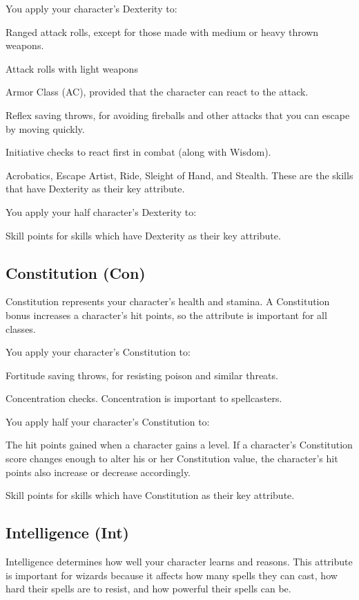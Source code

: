 You apply your character's Dexterity to:
\begin{itemize*}
\item Ranged attack rolls, except for those made with medium or heavy thrown weapons.
\item Attack rolls with light weapons
\item Armor Class (AC), provided that the character can react to the attack.
\item Reflex saving throws, for avoiding fireballs and other attacks that you can escape by moving quickly.
\item Initiative checks to react first in combat (along with Wisdom).
\item Acrobatics, Escape Artist, Ride, Sleight of Hand, and Stealth.  These are the skills that have Dexterity as their key attribute.
\end{itemize*}
You apply your half character's Dexterity to:
\begin{itemize*}
\item Skill points for skills which have Dexterity as their key attribute.
\end{itemize*}

\subsection{Constitution (Con)}
Constitution represents your character's health and stamina. A Constitution bonus increases a character's hit points, so the attribute is important for all classes.

You apply your character's Constitution to:
\begin{itemize*}
\item Fortitude saving throws, for resisting poison and similar threats.
\item Concentration checks. Concentration is important to spellcasters.
\end{itemize*}
You apply half your character's Constitution to:
\begin{itemize*}
\item The hit points gained when a character gains a level. If a character's Constitution score changes enough to alter his or her Constitution value, the character's hit points also increase or decrease accordingly.
\item Skill points for skills which have Constitution as their key attribute.
\end{itemize*}

\subsection{Intelligence (Int)}
Intelligence determines how well your character learns and reasons. This attribute is important for wizards because it affects how many spells they can cast, how hard their spells are to resist, and how powerful their spells can be.

